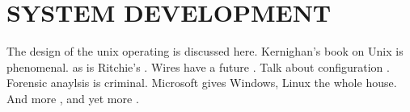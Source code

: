 
\chapter{SYSTEM DEVELOPMENT} %
\lipsum[1]
The design of the unix operating \cite{bach1986design} is discussed here.
Kernighan's \cite{kernighan1983unix} book on Unix is phenomenal.
as is Ritchie's \cite{ritchie1974unix}.
Wires have a future \cite{ho2001future}.
Talk about configuration \cite{hauck1998configuration}.
Forensic anaylsis \cite{stahlberg2007threats} is criminal. 
Microsoft gives Windows, Linux \cite{torvalds2002linux} the whole house.
And more \cite{buchholz2006structure}, and yet more \cite{gud2007chunkfs}.
\lipsum[2]

